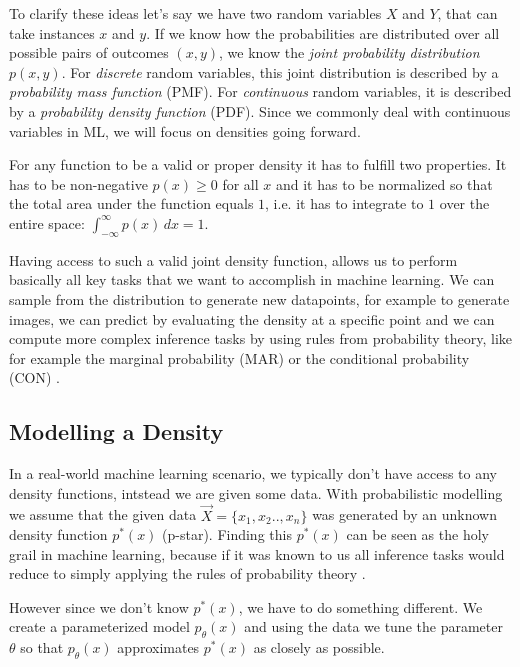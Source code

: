 To clarify these ideas let's say we have two random variables $X$ and $Y$, that can take instances $x$ and $y$. 
If we know how the probabilities are distributed over all possible pairs of outcomes $(x, y)$, we know the \textit{joint probability distribution} $p(x, y)$.
For \textit{discrete} random variables, this joint distribution is described by a \textit{probability mass function} (PMF). 
For \textit{continuous} random variables, it is described by a \textit{probability density function} (PDF).
Since we commonly deal with continuous variables in ML, we will focus on densities going forward.

For any function to be a valid or proper density it has to fulfill two properties. 
It has to be non-negative $p(x) \geq 0$ for all $x$
and it has to be normalized so that the total area under the function equals $1$, i.e. it has to integrate to $1$ over the entire space: $\int_{-\infty}^{\infty} p(x) \, dx = 1$.

Having access to such a valid joint density function, allows us to perform basically all key tasks that we want to accomplish in machine learning. 
We can sample from the distribution to generate new datapoints, for example to generate images, we can predict by evaluating the density at a specific point and 
we can compute more complex inference tasks by using rules from probability theory, like for example the marginal probability (MAR) or 
the conditional probability (CON) \cite{pc_intro}.

\subsection{Modelling a Density}
\label{sec:modelling_a_density}

In a real-world machine learning scenario, we typically don't have access to any density functions, intstead 
we are given some data. With probabilistic modelling we assume that the given data $\vec X = \{x_1, x_2 .. , x_n\}$ was generated by an unknown density function $p^*(x)$ (p-star).
Finding this $p^*(x)$ can be seen as the holy grail in machine learning, because if it was known to us all inference tasks would reduce to simply applying the 
rules of probability theory \cite{pc_intro}.

However since we don't know $p^*(x)$, we have to do something different.
We create a parameterized model $p_\theta(x)$ and using the data we tune the parameter $\theta$ so that $p_\theta(x)$ approximates $p^*(x)$ as closely as possible.

